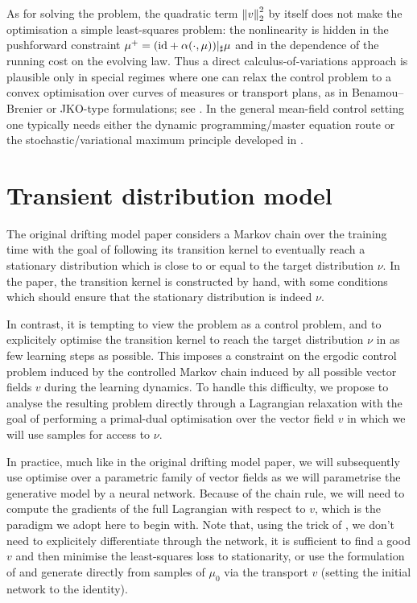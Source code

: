 \documentclass[twoside,10pt]{../jmlr}
\begin{document}
As for solving the problem, the quadratic term $\left\lVert v\right\rVert^2_2$ by itself does not make the optimisation a simple least-squares problem: the nonlinearity is hidden in the pushforward constraint $\mu^+=(\mathrm{id}+\alpha(\cdot,\mu))\vert_\sharp\mu$ and in the dependence of the running cost on the evolving law. Thus a direct calculus-of-variations approach is plausible only in special regimes where one can relax the control problem to a convex optimisation over curves of measures or transport plans, as in Benamou--Brenier or JKO-type formulations; see \citet{San15,JKO98,AGS05}. In the general mean-field control setting one typically needs either the dynamic programming/master equation route or the stochastic/variational maximum principle developed in \citet{BFY13,CD18I,CD18II}. 

\section{Transient distribution model}

The original drifting model paper \cite{deng2026generative} considers a Markov chain over the training time with the goal of following its transition kernel to eventually reach a stationary distribution which is close to or equal to the target distribution $\nu$. In the paper, the transition kernel is constructed by hand, with some conditions which should ensure that the stationary distribution is indeed $\nu$. 

In contrast, it is tempting to view the problem as a control problem, and to explicitely optimise the transition kernel to reach the target distribution $\nu$ in as few learning steps as possible. This imposes a constraint on the ergodic control problem induced by the controlled Markov chain induced by all possible vector fields $v$ during the learning dynamics. To handle this difficulty, we propose to analyse the resulting problem directly through a Lagrangian relaxation with the goal of performing a primal-dual optimisation over the vector field $v$ in which we will use samples for access to $\nu$. 

In practice, much like in the original drifting model paper, we will subsequently use optimise over a parametric family of vector fields as we will parametrise the generative model by a neural network. Because of the chain rule, we will need to compute the gradients of the full Lagrangian with respect to $v$, which is the paradigm we adopt here to begin with. Note that, using the trick of \cite{deng2026generative}, we don't need to explicitely differentiate through the network, it is sufficient to find a good $v$ and then minimise the least-squares loss to stationarity, or use the formulation of \cite{PDRLOT} and generate directly from samples of $\mu_0$ via the transport $v$ (setting the initial network to the identity).
\end{document}
